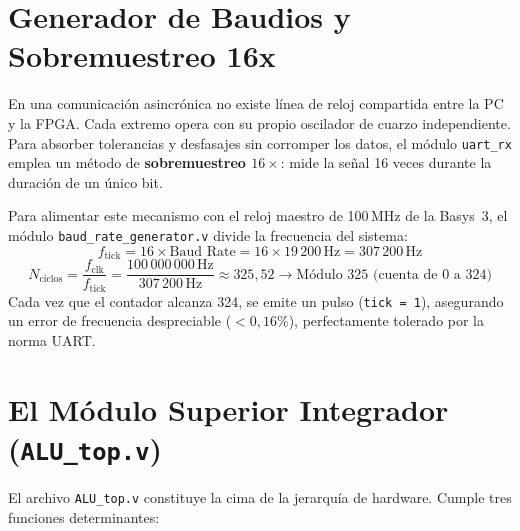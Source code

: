 \documentclass[10.5pt,a4paper]{article}
\begin{document}
\section{Generador de Baudios y Sobremuestreo 16x}
En una comunicación asincrónica no existe línea de reloj compartida entre la PC y la FPGA. Cada extremo opera con su propio oscilador de cuarzo independiente. Para absorber tolerancias y desfasajes sin corromper los datos, el módulo \texttt{uart\_rx} emplea un método de \textbf{sobremuestreo $16\times$}: mide la señal 16 veces durante la duración de un único bit.

Para alimentar este mecanismo con el reloj maestro de 100\,MHz de la Basys~3, el módulo \texttt{baud\_rate\_generator.v} divide la frecuencia del sistema:
\begin{equation}
    f_{\text{tick}} = 16 \times \text{Baud Rate} = 16 \times 19\,200\,\text{Hz} = 307\,200\,\text{Hz}
\end{equation}
\begin{equation}
    N_{\text{ciclos}} = \frac{f_{\text{clk}}}{f_{\text{tick}}} = \frac{100\,000\,000\,\text{Hz}}{307\,200\,\text{Hz}} \approx 325,52 \longrightarrow \text{Módulo 325 (cuenta de 0 a 324)}
\end{equation}
Cada vez que el contador alcanza 324, se emite un pulso (\texttt{tick = 1}), asegurando un error de frecuencia despreciable ($< 0{,}16\%$), perfectamente tolerado por la norma UART.

\newpage

\section{El Módulo Superior Integrador (\texttt{ALU\_top.v})}
El archivo \texttt{ALU\_top.v} constituye la cima de la jerarquía de hardware. Cumple tres funciones determinantes:
\end{document}
